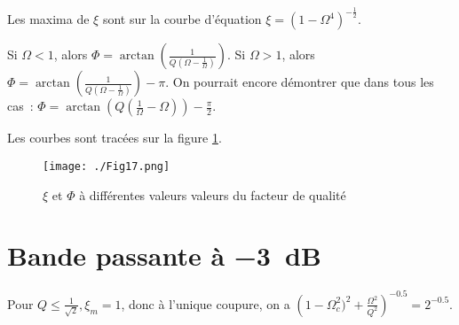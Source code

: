Les maxima de \(\xi\) sont sur la courbe d'équation \(\xi = (1-\Omega^4)^{-\frac{1}{2}}\).

Si \(\Omega <1\), alors \(\Phi = \arctan\left(\frac{1}{Q\left(\Omega-\frac{1}{\Omega}\right)}\right)\). Si \(\Omega >1\), alors \(\Phi = \arctan\left(\frac{1}{Q\left(\Omega-\frac{1}{\Omega}\right)}\right) - \pi\). On pourrait encore démontrer que dans tous les cas~: \(\Phi = \arctan\left(Q\left(\frac{1}{\Omega}-\Omega\right)\right)-\frac{\pi}{2}\).

Les courbes sont tracées sur la figure \ref{fig:oscforcees}.

\begin{figure}[!h]
    \centering
    \texttt{[image: ./Fig17.png]}
    \caption{\(\xi\) et \(\Phi\) à différentes valeurs valeurs du facteur de qualité}
    \label{fig:oscforcees}
\end{figure}

\section{Bande passante à \SI{-3}{\deci\bel}}

Pour \(Q \leq \frac{1}{\sqrt{2}}, \xi_m = 1\), donc à l'unique coupure, on a \(\left(1-\Omega_c^2)^2+\frac{\Omega^2}{Q^2}\right)^{-0.5} = 2^{-0.5}\).
